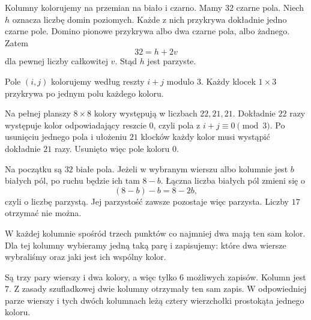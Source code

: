 \documentclass{lecture-kuznia}
\begin{document}
\begin{solution*}[\ref{Z3}]
	Kolumny kolorujemy na przemian na biało i czarno. Mamy $32$ czarne pola.
	Niech $h$ oznacza liczbę domin poziomych. Każde z nich przykrywa dokładnie
	jedno czarne pole. Domino pionowe przykrywa albo dwa czarne pola, albo
	żadnego. Zatem
	\[
		32=h+2v
	\]
	dla pewnej liczby całkowitej $v$. Stąd $h$ jest parzyste.
\end{solution*}

\begin{solution*}[\ref{Z4}]
	Pole $(i,j)$ kolorujemy według reszty $i+j$ modulo $3$. Każdy klocek
	$1\times3$ przykrywa po jednym polu każdego koloru.

	Na pełnej planszy $8\times8$ kolory występują w liczbach $22,21,21$.
	Dokładnie $22$ razy występuje kolor odpowiadający reszcie $0$, czyli pola
	z $i+j\equiv0\pmod3$. Po usunięciu jednego pola i ułożeniu $21$ klocków
	każdy kolor musi wystąpić dokładnie $21$ razy. Usunięto więc pole koloru
	$0$.
\end{solution*}

\begin{solution*}[\ref{Z5}]
	Na początku są $32$ białe pola. Jeżeli w wybranym wierszu albo kolumnie
	jest $b$ białych pól, po ruchu będzie ich tam $8-b$. Łączna liczba białych
	pól zmieni się o
	\[
		(8-b)-b=8-2b,
	\]
	czyli o liczbę parzystą. Jej parzystość zawsze pozostaje więc parzysta.
	Liczby $17$ otrzymać nie można.
\end{solution*}

\begin{solution*}[\ref{Z6}]
	W każdej kolumnie spośród trzech punktów co najmniej dwa mają ten sam
	kolor. Dla tej kolumny wybieramy jedną taką parę i zapisujemy: które dwa
	wiersze wybraliśmy oraz jaki jest ich wspólny kolor.

	Są trzy pary wierszy i dwa kolory, a więc tylko $6$ możliwych zapisów.
	Kolumn jest $7$. Z zasady szufladkowej dwie kolumny otrzymały ten sam
	zapis. W odpowiedniej parze wierszy i tych dwóch kolumnach leżą cztery
	wierzchołki prostokąta jednego koloru.
\end{solution*}
\end{document}
